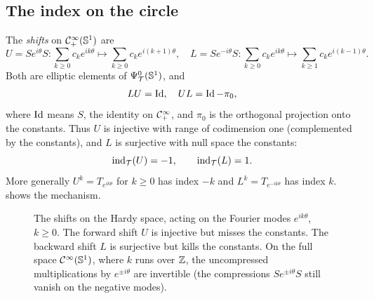 \subsection{The index on the circle}
The \emph{shifts} on $\mathcal{C}^\infty_{+}(\mathbb{S}^1)$ are
\begin{equation*}
  U=Se^{i\theta}S:\sum_{k\ge0}c_ke^{ik\theta}\mapsto\sum_{k\ge0}c_ke^{i(k+1)\theta},
  \quad
  L=Se^{-i\theta}S:\sum_{k\ge0}c_ke^{ik\theta}\mapsto\sum_{k\ge1}c_ke^{i(k-1)\theta}.
\end{equation*}
Both are elliptic elements of $\Psi^{0}_{\mathcal T}(\mathbb{S}^1)$, and
\begin{equation}\label{index:eq:shifts}
  LU=\operatorname{Id},\quad UL=\operatorname{Id}-\pi_0,
\end{equation}
where $\operatorname{Id}$ means $S$, the identity on $\mathcal{C}^\infty_{+}$, and $\pi_0$ is the orthogonal
projection onto the constants. Thus $U$ is injective with range of
codimension one (complemented by the constants), and $L$ is surjective with
null space the constants:
\begin{equation*}
  \operatorname{ind}_{\mathcal T}(U)=-1,\qquad\operatorname{ind}_{\mathcal T}(L)=1.
\end{equation*}
More generally $U^k=T_{e^{ik\theta}}$ for $k\ge0$ has index $-k$ and
$L^k=T_{e^{-ik\theta}}$ has index $k$.  shows the
mechanism.

\begin{figure}[ht]
\centering
{}
\caption{The shifts on the Hardy space, acting on the Fourier modes
$e^{ik\theta}$, $k\ge0$. The forward shift $U$ is injective but misses the
constants. The backward shift $L$ is surjective but kills the constants. On the
full space $\mathcal{C}^\infty(\mathbb{S}^1)$, where $k$ runs over $\mathbb{Z}$, the uncompressed
multiplications by $e^{\pm i\theta}$ are invertible (the compressions
$Se^{\pm i\theta}S$ still vanish on the negative modes).}
\label{index:fig:shifts}
\end{figure}

